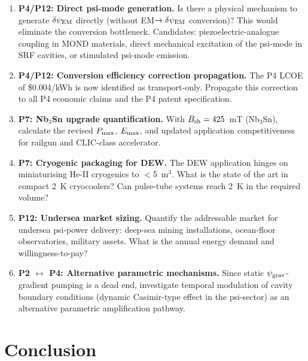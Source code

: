 \documentclass[11pt]{article}
\newcommand{\psigrav}{\psi_{\rm grav}}
\newcommand{\dpsiEM}{\delta\psi_{\rm EM}}
\newcommand{\Pmax}{P_{\rm max}}
\begin{document}
\begin{enumerate}
\item \textbf{P4/P12: Direct psi-mode generation.} Is there a physical
  mechanism to generate $\dpsiEM$ directly (without EM$\to\dpsiEM$
  conversion)? This would eliminate the conversion bottleneck. Candidates:
  piezoelectric-analogue coupling in MOND materials, direct mechanical
  excitation of the psi-mode in SRF cavities, or stimulated psi-mode
  emission.

\item \textbf{P4/P12: Conversion efficiency correction propagation.}
  The P4 LCOE of \$0.004/kWh is now identified as transport-only.
  Propagate this correction to all P4 economic claims and the P4 patent
  specification.

\item \textbf{P7: Nb$_3$Sn upgrade quantification.} With $B_{\rm sh}
  = 425$~mT (Nb$_3$Sn), calculate the revised $\Pmax$, $E_{\rm max}$,
  and updated application competitiveness for railgun and CLIC-class
  accelerator.

\item \textbf{P7: Cryogenic packaging for DEW.} The DEW application
  hinges on miniaturising He-II cryogenics to $<$5~m$^3$. What is the
  state of the art in compact 2~K cryocoolers? Can pulse-tube systems
  reach 2~K in the required volume?

\item \textbf{P12: Undersea market sizing.} Quantify the addressable
  market for undersea psi-power delivery: deep-sea mining installations,
  ocean-floor observatories, military assets. What is the annual energy
  demand and willingness-to-pay?

\item \textbf{P2 $\leftrightarrow$ P4: Alternative parametric mechanisms.}
  Since static $\psigrav$-gradient pumping is a dead end, investigate
  temporal modulation of cavity boundary conditions (dynamic Casimir-type
  effect in the psi-sector) as an alternative parametric amplification
  pathway.
\end{enumerate}

\section{Conclusion}
\label{sec:conclusion}
\end{document}
